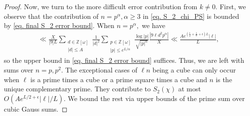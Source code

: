 \documentclass[11pt]{amsart}
\numberwithin{equation}{section}
\theoremstyle{remark}
\begin{document}
\begin{proof}
Now, we turn to the more difficult error contribution from $k\ne 0$. First, we observe that the contribution of $n=p^\alpha, \alpha\ge 3$ in \eqref{eq. S_2_chi_PS} is bounded by \ref{eq. final S_2 error bound}. 
When $n=p^\alpha,$ we have
\begin{align*}
    &\ll \frac{X}{|9|L}
    \sum_{\substack{d\in \mathbb{Z}[\omega]\\ |d|\le A}}\frac{1}{|d|^2}
	\sum_{\substack{p\in \mathbb{Z}[\omega]\\|p|\le e^{L/\alpha}}}\frac{\log |p|}{\sqrt{|p|^\alpha}}
    \frac{|9\ell d^2 p^\alpha|}{X}
    \ll
    \frac{Ae^{(\frac{1}{2}+\frac{1}{\alpha}+\epsilon)L}|\ell|}{L},
\end{align*}
so the upper bound in \eqref{eq. final S_2 error bound} suffices.
Thus, we are left with sums over $n=p, p^2.$ 
The exceptional cases of $\ell n $ being a cube can only occur when $\ell$ is a prime times a cube or a prime square times a cube and $n$ is the unique complementary prime. They contribute to $S_2(\chi)$ at most $O(Ae^{L/2+\epsilon}|\ell|/L)$.
We bound the rest via upper bounds of the prime sum over cubic Gauss sums. 


\end{proof}
\end{document}
